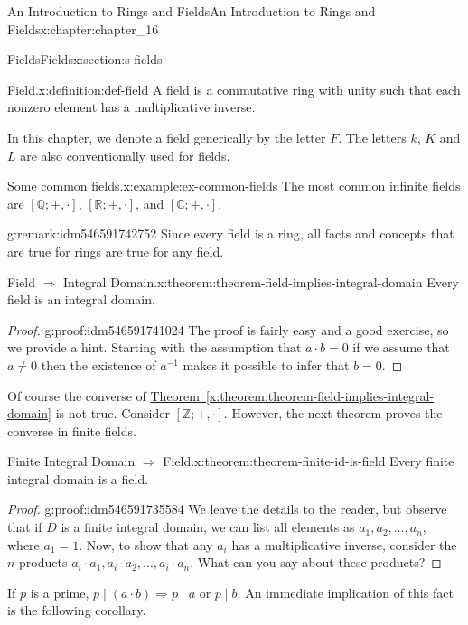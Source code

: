 \documentclass[oneside,10pt,]{book}
\newcommand{\xreffont}{\relax}
\numberwithin{equation}{section}
\begin{document}
\begin{chapterptx}{An Introduction to Rings and Fields}{}{An Introduction to Rings and Fields}{}{}{x:chapter:chapter_16}
\begin{sectionptx}{Fields}{}{Fields}{}{}{x:section:s-fields}
\begin{definition}{Field.}{x:definition:def-field}%
%
A field is a commutative ring with unity such that each nonzero element has a multiplicative inverse.%
\end{definition}
In this chapter, we denote a field generically by the letter \(F\).  The letters \(k\), \(K\) and \(L\) are also conventionally used for fields.%
\begin{example}{Some common fields.}{x:example:ex-common-fields}%
The most common infinite fields are \([\mathbb{Q}; +, \cdot ]\), \([\mathbb{R}; +, \cdot ]\),  and \([\mathbb{C}; +, \cdot ]\).%
\end{example}
\begin{remark}{}{g:remark:idm546591742752}%
Since every field is a ring, all facts and concepts that are true for rings are true for any field.%
\end{remark}
\begin{theorem}{Field \(\Rightarrow\) Integral Domain.}{}{x:theorem:theorem-field-implies-integral-domain}%
Every field is an integral domain.%
\end{theorem}
\begin{proof}{}{g:proof:idm546591741024}
The proof is fairly easy and a good exercise, so we provide a hint.  Starting with the assumption that \(a\cdot b= 0\) if we assume that \(a \neq 0\) then the existence of \(a^{-1}\) makes it possible to infer that \(b=0\).%
\end{proof}
Of course the converse of \hyperref[x:theorem:theorem-field-implies-integral-domain]{Theorem~{\xreffont\ref{x:theorem:theorem-field-implies-integral-domain}}} is not true.  Consider \([\mathbb{Z}; +, \cdot ]\).  However, the next theorem proves the converse in finite fields.%
\begin{theorem}{Finite Integral Domain \(\Rightarrow\) Field.}{}{x:theorem:theorem-finite-id-is-field}%
Every finite integral domain is a field.%
\end{theorem}
\begin{proof}{}{g:proof:idm546591735584}
We leave the details to the reader, but observe that if \(D\) is a finite integral domain, we can list all elements as \(a_1,	a_2, \ldots, a_n\), where \(a_1=1\).   Now, to show that any \(a_i\) has a multiplicative inverse, consider the \(n\) products \(a_i \cdot a_1,	a_i \cdot a_2, \ldots, a_i \cdot a_n\).  What can you say about these products?%
\end{proof}
If \(p\) is a prime, \(p\mid (a\cdot b) \Rightarrow p\mid a \textrm{ or } p\mid b\).  An immediate implication of this fact is the following corollary.%

\end{sectionptx}
\end{chapterptx}
\end{document}
